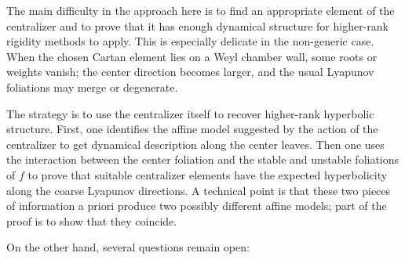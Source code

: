 \documentclass[11pt]{amsart}
\numberwithin{equation}{section}
\theoremstyle{plain}
\begin{document}
The main difficulty in the approach here is to find an appropriate element of the centralizer and
to prove that it has enough dynamical structure for higher-rank rigidity
methods to apply.  This is especially delicate in the non-generic case.
When the chosen Cartan element lies on a Weyl chamber wall, some roots or
weights vanish; the center direction becomes larger, and the usual
Lyapunov foliations may merge or degenerate.

The strategy is to use the centralizer itself to recover higher-rank
hyperbolic structure.  First, one identifies the affine model suggested by
the action of the centralizer to get dynamical description along the center leaves.  Then one uses the
interaction between the center foliation and the stable and unstable
foliations of \(f\) to prove that suitable centralizer elements have the
expected hyperbolicity along the coarse Lyapunov directions.  A technical
point is that these two pieces of information a priori produce two possibly
different affine models; part of the proof is to show that they coincide.

On the other hand, several questions remain open:
\end{document}
